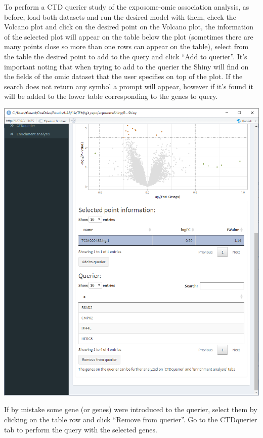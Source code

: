 \documentclass[
]{book}
\begin{document}
To perform a CTD querier study of the exposome-omic association analysis, as before, load both datasets and run the desired model with them, check the Volcano plot and click on the desired point on the Volcano plot, the information of the selected plot will appear on the table below the plot (sometimes there are many points close so more than one rows can appear on the table), select from the table the desired point to add to the query and click ``Add to querier''. It's important noting that when trying to add to the querier the Shiny will find on the fields of the omic dataset that the user specifies on top of the plot. If the search does not return any symbol a prompt will appear, however if it's found it will be added to the lower table corresponding to the genes to query.

\includegraphics{images/analysis10_2.png}

If by mistake some gene (or genes) were introduced to the querier, select them by clicking on the table row and click ``Remove from querier''. Go to the CTDquerier tab to perform the query with the selected genes.
\end{document}
